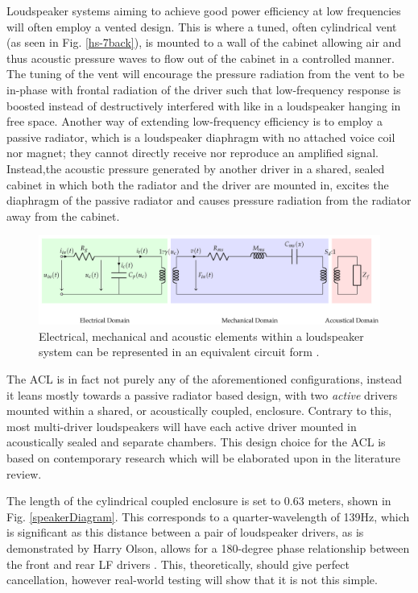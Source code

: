 \documentclass{report}
\begin{document}
        Loudspeaker systems aiming to achieve good power efficiency at low frequencies will often employ a vented design.
        This is where a tuned, often cylindrical vent (as seen in Fig. \ref{hs-7back}), is mounted to a wall of the cabinet allowing air and thus acoustic pressure waves to flow out of the cabinet in a controlled manner.
        The tuning of the vent will encourage the pressure radiation from the vent to be in-phase with frontal radiation of the driver such that low-frequency response is boosted instead of destructively interfered with like in a loudspeaker hanging in free space.
        Another way of extending low-frequency efficiency is to employ a passive radiator, which is a loudspeaker diaphragm with no attached voice coil nor magnet; they cannot directly receive nor reproduce an amplified signal.
        Instead,the acoustic pressure generated by another driver in a shared, sealed cabinet in which both the radiator and the driver are mounted in, excites the diaphragm of the passive radiator and causes pressure radiation from the radiator away from the cabinet.

        \begin{figure}[H]
            \centering
            \includegraphics[width = \textwidth]{figs/equivalentCircuit.png}
            \caption{Electrical, mechanical and acoustic elements within a loudspeaker system can be represented in an equivalent circuit form \cite{liechti2021total}.}
            \label{equivalentCircuit}
        \end{figure}

        The ACL is in fact not purely any of the aforementioned configurations, instead it leans mostly towards a passive radiator based design, with two \textit{active} drivers mounted within a shared, or acoustically coupled, enclosure.
        Contrary to this, most multi-driver loudspeakers will have each active driver mounted in acoustically sealed and separate chambers.
        This design choice for the ACL is based on contemporary research which will be elaborated upon in the literature review.

        The length of the cylindrical coupled enclosure is set to 0.63 meters, shown in Fig. \ref{speakerDiagram}.
        This corresponds to a quarter-wavelength of 139Hz, which is significant as this distance between a pair of loudspeaker drivers, as is demonstrated by Harry Olson, allows for a 180-degree phase relationship between the front and rear LF drivers \cite{olson1973gradient}.
        This, theoretically, should give perfect cancellation, however real-world testing will show that it is not this simple.
\end{document}
